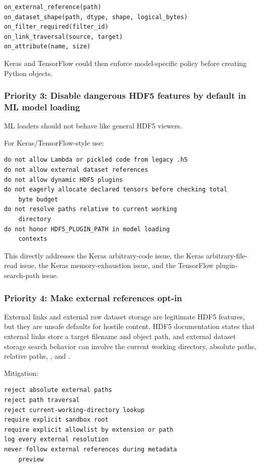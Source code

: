 \documentclass[../main.tex]{subfiles}
\begin{document}
\begin{verbatim}
on_external_reference(path)
on_dataset_shape(path, dtype, shape, logical_bytes)
on_filter_required(filter_id)
on_link_traversal(source, target)
on_attribute(name, size)
\end{verbatim}

Keras and TensorFlow could then enforce model-specific policy before creating Python objects.

\subsubsection*{Priority 3: Disable dangerous HDF5 features by default in ML model loading}

ML loaders should not behave like general HDF5 viewers.

For Keras/TensorFlow-style use:
\begin{verbatim}
do not allow Lambda or pickled code from legacy .h5
do not allow external dataset references
do not allow dynamic HDF5 plugins
do not eagerly allocate declared tensors before checking total
    byte budget
do not resolve paths relative to current working
    directory
do not honor HDF5_PLUGIN_PATH in model loading
    contexts
\end{verbatim}   
This directly addresses the Keras arbitrary-code issue, the Keras arbitrary-file-read issue, the Keras memory-exhaustion
issue, and the TensorFlow plugin-search-path issue.

\subsubsection*{Priority 4: Make external references opt-in}

External links and external raw dataset storage are legitimate HDF5 features,
but they are unsafe defaults for hostile content.
HDF5 documentation states that external links store a target
filename and object path, and external dataset storage search
behavior can involve the current working directory, absolute
paths, relative paths, , and .

Mitigation:
\begin{verbatim}
reject absolute external paths
reject path traversal
reject current-working-directory lookup
require explicit sandbox root
require explicit allowlist by extension or path
log every external resolution
never follow external references during metadata
    preview
\end{verbatim}
\end{document}

